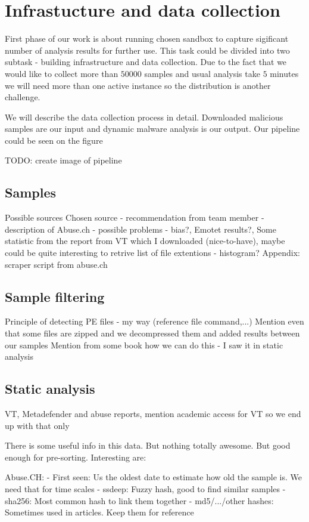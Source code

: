 \chapter{Infrastucture and data collection}
First phase of our work is about running chosen sandbox to capture sigificant number of analysis results for further use. This task could be divided into two subtask - building infrastructure and data collection. Due to the fact that we would like to collect more than $50 000$ samples and usual analysis take $5$ minutes we will need more than one active instance so the distribution is another challenge.

We will describe the data collection process in detail. Downloaded malicious samples are our input and dynamic malware analysis is our output. Our pipeline could be seen on the figure 

TODO: create image of pipeline 

\section{Samples}
Possible sources
Chosen source
- recommendation from team member
- description of Abuse.ch
- possible problems - bias?, Emotet results?, Some statistic from the report from VT which I downloaded (nice-to-have), maybe could be quite interesting to retrive list of file extentions - histogram?
Appendix: scraper script from abuse.ch
\section{Sample filtering}
Principle of detecting PE files - my way (reference file command,...)
Mention even that some files are zipped and we decompressed them and added results between our samples
Mention from some book how we can do this - I saw it in static analysis

\section{Static analysis}
VT, Metadefender and abuse reports, mention academic access for VT so we end up with that only

There is some useful info in this data. But nothing totally awesome. But good enough for pre-sorting.
Interesting are:

Abuse.CH:
- First seen: Us the oldest date to estimate how old the sample is. We need that for time scales
- ssdeep: Fuzzy hash, good to find similar samples
- sha256: Most common hash to link them together
- md5/.../other hashes: Sometimes used in articles. Keep them for reference

